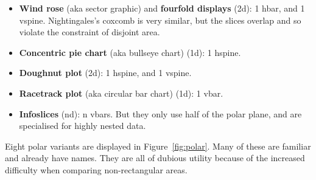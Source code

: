 \documentclass[journal]{vgtc}
\begin{document}
\begin{itemize}
  \setlength{\itemsep}{0em}
  
  \item {\bf Wind rose} (aka sector graphic) \citep{lalanne:1843} and {\bf fourfold displays} \citep{friendly:1995} (2d): 1 hbar, and 1 vspine. Nightingales's coxcomb \citep{nightingale:1857} is very similar, but the slices overlap and so violate the constraint of disjoint area.

  \item {\bf Concentric pie chart} (aka bullseye chart) (1d): 1 hspine.

  \item {\bf Doughnut plot} (2d): 1 hspine, and 1 vspine.

  \item {\bf Racetrack plot} (aka circular bar chart) (1d): 1 vbar.

  \item {\bf Infoslices} \citep{andrews:1998} (nd): n vbars. But they only use half of the polar plane, and are specialised for highly nested data.

\end{itemize}

\noindent Eight polar variants are displayed in Figure~\ref{fig:polar}. Many of these are familiar and already have names. They are all of dubious utility because of the increased difficulty when comparing non-rectangular areas.
\end{document}
